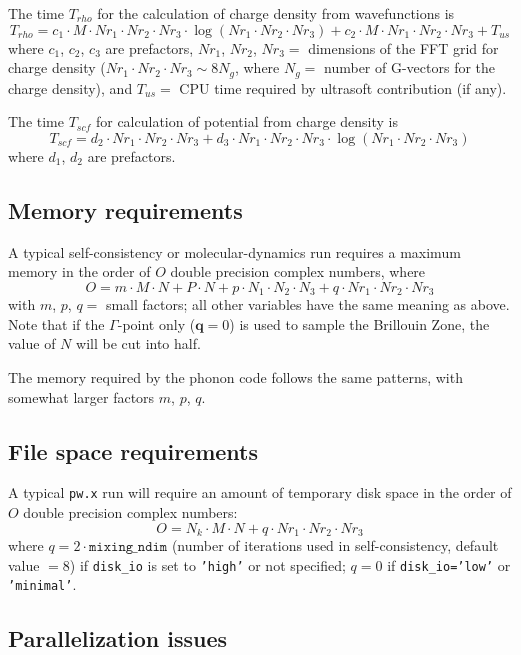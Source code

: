 \documentclass[12pt,a4paper]{article}
\begin{document}
The time $T_{rho}$ for the calculation of charge density from
wavefunctions is
$$
T_{rho} = c_1 \cdot M \cdot Nr_1 \cdot Nr_2 \cdot Nr_3 \cdot
          \log(Nr_1 \cdot Nr_2 \cdot Nr_3)
          + c_2 \cdot M \cdot Nr_1 \cdot Nr_2 \cdot Nr_3 + T_{us}
$$
where $c_1$, $c_2$, $c_3$ are prefactors,
$Nr_1$, $Nr_2$, $Nr_3=$ dimensions of the FFT grid for charge density
($Nr_1 \cdot Nr_2 \cdot Nr_3 \sim 8N_g$, where $N_g=$ number of
G-vectors for the charge density), and $T_{us}=$ CPU time required by
ultrasoft contribution (if any).

The time $T_{scf}$ for calculation of potential from charge density is
$$
T_{scf} = d_2 \cdot Nr_1 \cdot Nr_2 \cdot Nr_3 + d_3 \cdot
          Nr_1 \cdot Nr_2 \cdot Nr_3 \cdot
          \log(Nr_1 \cdot Nr_2 \cdot Nr_3) 
$$
where $d_1$, $d_2$ are prefactors.

\subsection{Memory requirements}

A typical self-consistency or molecular-dynamics run requires 
a maximum memory in the order
of $O$ double precision complex numbers, where
$$
O = m \cdot M \cdot N + P \cdot N + p \cdot N_1 \cdot N_2 \cdot N_3
    + q \cdot Nr_1 \cdot Nr_2 \cdot Nr_3
$$
with $m$, $p$, $q=$ small factors; all other variables have the same
meaning as above.
Note that if the $\Gamma$-point only ($\mathbf{q}=0$) is used to
sample the Brillouin Zone, the value of $N$ will be cut into half.

The memory required by the phonon code follows the same patterns,
with somewhat larger factors $m$, $p$, $q$.

\subsection{File space requirements}

A typical \texttt{pw.x} run will require an amount of temporary disk
space in the order of $O$ double precision complex numbers:
$$
O = N_k \cdot M \cdot N + q \cdot Nr_1 \cdot Nr_2 \cdot Nr_3
$$
where $q=2 \cdot \mathtt{mixing\_ndim}$ (number of iterations used in
self-consistency, default value $=8$) if \texttt{disk\_io} is set to
\texttt{'high'} or not specified;
$q=0$ if \texttt{disk\_io='low'} or \texttt{'minimal'}.

\subsection{Parallelization issues}
  \label{parissues}
\end{document}
